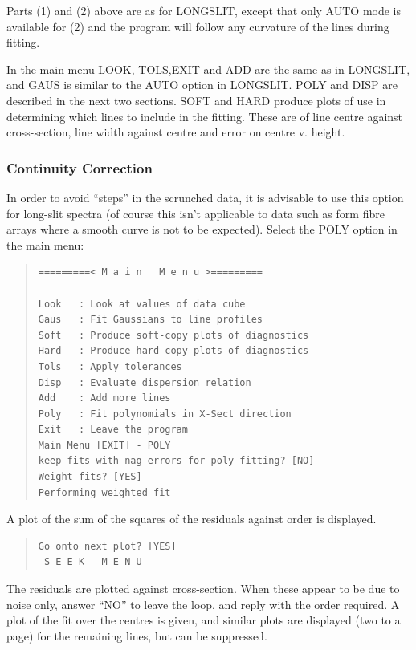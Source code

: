\documentclass[11pt,twoside]{article}
\newcommand{\xlabel}[1]{}
\begin{document}
Parts (1) and (2) above are as for LONGSLIT, except that only AUTO
mode is available for (2) and the program will follow any curvature
of the lines during fitting.

In the main menu LOOK, TOLS,EXIT and ADD are the same as in LONGSLIT,
and GAUS is similar to the AUTO option in LONGSLIT. POLY and DISP are
described in the next two sections. SOFT and HARD produce plots of use
in determining which lines to include in the fitting. These are of line
centre against cross-section, line width against centre and error on
centre v. height.

\subsubsection{\xlabel{continuity_correction}Continuity Correction}
\label{arc2d.continuity}

In order to avoid ``steps'' in the scrunched data, it is advisable to
use this option for long-slit spectra (of course this isn't applicable
to data such as form fibre arrays where a smooth curve is not to be
expected).
Select the POLY option in the main menu:

\begin{quote}\begin{verbatim}
=========< M a i n   M e n u >=========

Look   : Look at values of data cube
Gaus   : Fit Gaussians to line profiles
Soft   : Produce soft-copy plots of diagnostics
Hard   : Produce hard-copy plots of diagnostics
Tols   : Apply tolerances
Disp   : Evaluate dispersion relation
Add    : Add more lines
Poly   : Fit polynomials in X-Sect direction
Exit   : Leave the program
Main Menu [EXIT] - POLY
keep fits with nag errors for poly fitting? [NO]
Weight fits? [YES]
Performing weighted fit
\end{verbatim}\end{quote}

A plot of the sum of the squares of the residuals against order is
displayed.

\begin{quote}\begin{verbatim}
Go onto next plot? [YES]
 S E E K   M E N U
\end{verbatim}\end{quote}

The residuals are plotted against cross-section. When these appear to
be due to noise only, answer ``NO'' to leave the loop, and reply with
the order required. A plot of the fit over the centres is given, and
similar plots are displayed (two to a page) for the remaining lines,
but can be suppressed.
\end{document}
